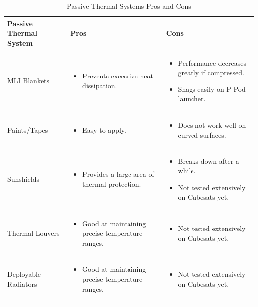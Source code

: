 \begin{table}[H]
\centering
\begin{tabular}{|p{}|p{}|p{}|} 
\hline
\textbf{Passive Thermal System} & \textbf{Pros} & \textbf{Cons}
\\
\hline
     MLI Blankets
     &
    \begin{itemize}
        \item Prevents excessive heat dissipation.
    \end{itemize}
    &
    \begin{itemize}
        \item Performance decreases greatly if compressed.
        \item Snags easily on P-Pod launcher.
    \end{itemize}
    \\
\hline
     Paints/Tapes
     &
    \begin{itemize}
        \item Easy to apply.
    \end{itemize}
    &
        \begin{itemize}
        \item Does not work well on curved surfaces.
    \end{itemize}
    \\
\hline
    Sunshields
    &
    \begin{itemize}
        \item Provides a large area of thermal protection.
    \end{itemize}
    &
    \begin{itemize}
        \item Breaks down after a while.
        \item Not tested extensively on Cubesats yet.
    \end{itemize}
    \\
\hline
    Thermal Louvers
    &
    \begin{itemize}
        \item Good at maintaining precise temperature ranges.
    \end{itemize}
    &
    \begin{itemize}
        \item Not tested extensively on Cubesats yet.
    \end{itemize}
    \\
\hline
    Deployable Radiators
    &
    \begin{itemize}
        \item Good at maintaining precise temperature ranges.
    \end{itemize}
    &
    \begin{itemize}
        \item Not tested extensively on Cubesats yet.
    \end{itemize}
    \\
\hline
\end{tabular}
\caption{Passive Thermal Systems Pros and Cons}
\label{tbl:Passive_Thermal_ProCon}
\end{table}

